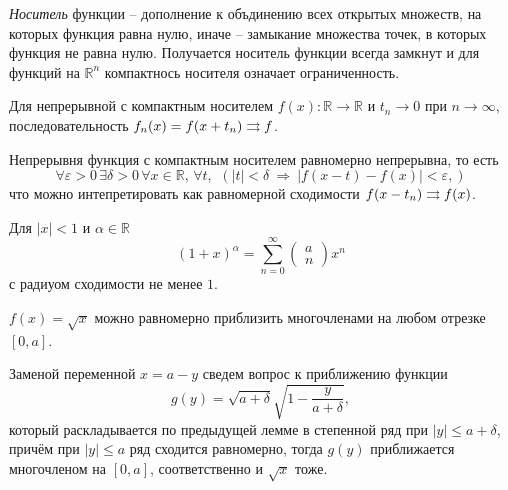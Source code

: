 
\textit{Носитель} функции -- дополнение к объдинению всех открытых множеств, на которых функция равна нулю, иначе -- замыкание множества точек, в которых функция не равна нулю. Получается носитель функции всегда замкнут и для функций на $\mathbb{R}^n$ компактнось носителя означает ограниченность. 

\begin{to_lem}
    Для непрерывной с компактным носителем $f(x) \colon \mathbb{R} \to \mathbb{R}$ и $t_n \to 0$ при $n \to \infty$, последовательность $f_n(x) = f(x + t_n) \rightrightarrows f$.
\end{to_lem}

\begin{uproof}
Непрерывня функция с компактным носителем равномерно непрерывна, то есть
\begin{equation*}
    \forall \varepsilon > 0 \,  \exists \delta > 0 \, \forall x \in \mathbb{R},\, \forall t,\, \ 
    \left(
        |t| < \delta \ \Rightarrow \ |f(x-t) - f(x)| < \varepsilon,
    \right)
\end{equation*}
что можно интепретировать как равномерной сходимости $f(x-t_n) \rightrightarrows f(x)$. 
\end{uproof}


\begin{to_thr}[]
    Для $|x| < 1$ и $\alpha \in \mathbb{R}$ $$(1+x)^\alpha = \sum_{n=0}^{\infty} \begin{pmatrix}
        a \\ n
    \end{pmatrix} x^n$$ с радиуом сходимости не менее $1$. 
\end{to_thr}

\begin{to_lem}
    $f(x) = \sqrt{x}$ можно равномерно приблизить многочленами на любом отрезке $[0,a]$.
\end{to_lem}

\begin{uproof}
    Заменой переменной $x = a -y$ сведем вопрос к приближению функции
    \begin{equation*}
        g(y) = \sqrt{a + \delta} \sqrt{1 - \frac{y}{a+\delta}},
    \end{equation*}
    который раскладывается по предыдущей лемме в степенной ряд при $|y| \leq a + \delta$, причём при $|y| \leq a$ ряд сходится равномерно, тогда $g(y)$ приближается многочленом на $[0, a]$, соответственно и $\sqrt{x}$ тоже. 
\end{uproof}


